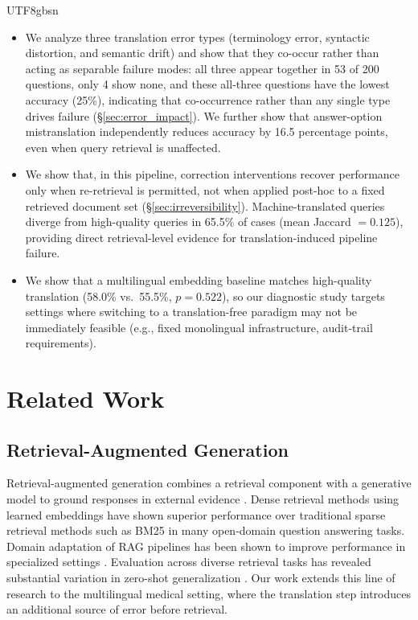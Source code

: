 \documentclass[11pt]{article}
\begin{document}
\begin{CJK}{UTF8}{gbsn}
\begin{itemize}
\item We analyze three translation error types (terminology error, syntactic distortion, and semantic drift) and show that they co-occur rather than acting as separable failure modes: all three appear together in 53 of 200 questions, only 4 show none, and these all-three questions have the lowest accuracy (25\%), indicating that co-occurrence rather than any single type drives failure (\S\ref{sec:error_impact}). We further show that answer-option mistranslation independently reduces accuracy by 16.5 percentage points, even when query retrieval is unaffected.

\item We show that, in this pipeline, correction interventions recover performance only when re-retrieval is permitted, not when applied post-hoc to a fixed retrieved document set (\S\ref{sec:irreversibility}). Machine-translated queries diverge from high-quality queries in 65.5\% of cases (mean Jaccard $= 0.125$), providing direct retrieval-level evidence for translation-induced pipeline failure.

\item We show that a multilingual embedding baseline matches high-quality translation (58.0\% vs.\ 55.5\%, $p = 0.522$), so our diagnostic study targets settings where switching to a translation-free paradigm may not be immediately feasible (e.g., fixed monolingual infrastructure, audit-trail requirements).
\end{itemize}

\section{Related Work}
\subsection{Retrieval-Augmented Generation}
Retrieval-augmented generation combines a retrieval component with a generative model to ground responses in external evidence \cite{NEURIPS2020_6b493230}. Dense retrieval methods using learned embeddings \cite{karpukhin2020dense, reimers-gurevych-2019-sentence} have shown superior performance over traditional sparse retrieval methods such as BM25 in many open-domain question answering tasks. Domain adaptation of RAG pipelines has been shown to improve performance in specialized settings \cite{siriwardhana2023improving}. Evaluation across diverse retrieval tasks has revealed substantial variation in zero-shot generalization \cite{thakur2021beir}. Our work extends this line of research to the multilingual medical setting, where the translation step introduces an additional source of error before retrieval.


\end{CJK}
\end{document}
